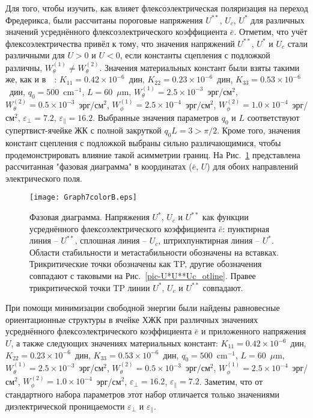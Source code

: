 Для того, чтобы изучить, как влияет флексоэлектрическая поляризация на переход Фредерикса, были рассчитаны пороговые напряжения $U^{**}$, $U_c$, $U^{*}$ для различных значений усреднённого флексоэлектрического коэффициента $\bar{e}$.
Отметим, что учёт флексоэлектричества привёл к тому, что значения напряжений $U^{**}$, $U^*$ и $U_c$ стали различными для  $U>0$ и $U<0$, если константы сцепления с подложкой различны, $W_\theta^{(1)}\not=W_\theta^{(2)}$.
Значения материальных констант были взяты такими же, как и в~~\cite{VAR2013}: $K_{11}=0.42\times 10^{-6}$~дин, $K_{22}=0.23\times 10^{-6}$~дин, $K_{33}=0.53\times 10^{-6}$~дин,  $q_0=500$~$\text{cm}^{-1}$, $L=60$~$\mu\text{m}$, $W_\theta^{(1)}=2.5\times 10^{-3}$~эрг/см$^2$, $W_\theta^{(2)}=0.5\times 10^{-3}$~эрг/см$^2$,  $W_\phi^{(1)}=2.5\times 10^{-4}$~эрг/см$^2$, $W_\phi^{(2)}=1.0\times 10^{-4}$~эрг/см$^2$, $\varepsilon_\bot=7.2$, $\varepsilon_\|=16.2$.
Выбранные значения параметров $q_0$ и $L$ соответствуют супертвист-ячейке ЖК с полной закруткой $q_0L = 3>\pi/2$.
Кроме того, значения констант сцепления с подложкой выбраны сильно различающимися, чтобы продемонстрировать влияние такой асимметрии границ.
На Рис.~\ref{pic-U_from_e_pos} представлена рассчитанная "фазовая диаграмма" в координатах ($\bar{e}$, $U$) для обоих направлений электрического поля.
\begin{figure}%
	\centering
	\texttt{[image: Graph7colorB.eps]}
	\caption{Фазовая диаграмма.
		Напряжения $U^*$, $U_c$ и $U^{**}$ как функции усреднённого флексоэлектрического коэффициента $\bar{e}$: пунктирная линия -- $U^{**}$, сплошная линия -- $U_c$, штрихпунктирная линия -- $U^{*}$.
		Области стабильности и метастабильности обозначены на вставках.
		Трикритические точки обозначены как TP, другие обозначения совпадают с таковыми на Рис.~\ref{pic-U*U**Uc_otline}.
		Правее трикритической точки TP линии $U^*$, $U_c$ и $U^{**}$ совпадают.}
	\label{pic-U_from_e_pos}
\end{figure}







При помощи минимизации свободной энергии были найдены равновесные ориентационные структуры в ячейке ХЖК при различных значениях усреднённого флексоэлектрического коэффициента $\bar{e}$ и приложенного напряжения $U$, а также следующих значениях материальных констант: $K_{11}=0.42\times 10^{-6}$~дин, $K_{22}=0.23\times 10^{-6}$~дин, $K_{33}=0.53\times 10^{-6}$~дин,  $q_0=500$~$\text{cm}^{-1}$, $L=60$~$\mu\text{m}$, $W_\theta^{(1)}=2.5\times 10^{-3}$~эрг/см$^2$, $W_\theta^{(2)}=0.5\times 10^{-3}$~эрг/см$^2$,  $W_\phi^{(1)}=2.5\times 10^{-4}$~эрг/см$^2$, $W_\phi^{(2)}=1.0\times 10^{-4}$~эрг/см$^2$, $\varepsilon_\bot=16.2$, $\varepsilon_\|=7.2$.
Заметим, что от стандартного набора параметров этот набор отличается только значениями диэлектрической проницаемости $\varepsilon_\bot$ и $\varepsilon_\|$.

